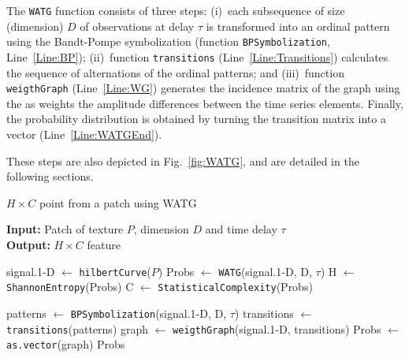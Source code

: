 \documentclass[journal]{IEEEtran}
\begin{document}
The \texttt{WATG} function consists of three steps: 
(i)~each subsequence of size (dimension) $D$ of observations at delay $\tau$ is transformed into an ordinal pattern using the Bandt-Pompe symbolization (function \texttt{BPSymbolization}, Line~\ref{Line:BP}); 
(ii)~function \texttt{transitions} (Line~\ref{Line:Transitions}) calculates the sequence of alternations of the ordinal patterns; and 
(iii)~function \texttt{weigthGraph} (Line~\ref{Line:WG}) generates the incidence matrix of the graph using the as weights the amplitude differences between the time series elements.
Finally, the probability distribution is obtained by turning the transition matrix into a vector (Line~\ref{Line:WATGEnd}).

These steps are also depicted in Fig.~\ref{fig:WATG}, and are detailed in the following sections.

\begin{algorithm}[hbt]
	\caption{$H \times C$ point from a patch using WATG}
	\label{alg:watg}                                
	\textbf{Input:} Patch of texture $P$, dimension $D$ and time delay \textbf{$\tau$}\\
	\textbf{Output:} $H \times C$ feature
	\begin{algorithmic}[1]
		\State signal.1-D $\gets$ \texttt{hilbertCurve}($P$) \label{Line:Peano}
		\State Probs $\gets$ \texttt{WATG}(signal.1-D, D, $\tau$) \label{Line:Probs}
		\State H $\gets$ \texttt{ShannonEntropy}(Probs) \label{Line:Shannon}
		\State C $\gets$ \texttt{StatisticalComplexity}(Probs) \label{Line:StatisticalComplexity}
		
		\vspace{0.15cm}
		
		\State patterns $\gets$ \label{Line:WATGBegin} \texttt{BPSymbolization}(signal.1-D, D, $\tau$) \label{Line:BP}
		\State transitions $\gets$ \texttt{transitions}(patterns) \label{Line:Transitions}
		\State graph $\gets$ \texttt{weigthGraph}(signal.1-D, transitions) \label{Line:WG}
		\State Probs $\gets$ \texttt{as.vector}(graph) \label{Line:WATGEnd}
		\State \Return Probs
		\EndFunction
	\end{algorithmic}
\end{algorithm}
\end{document}
